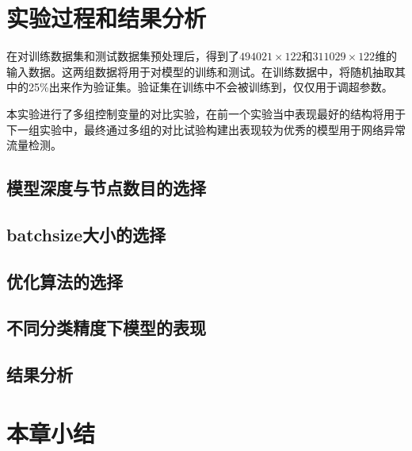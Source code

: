 \section{实验过程和结果分析}

在对训练数据集和测试数据集预处理后，得到了$494021 \times 122$和$311029 \times 122$维的输入数据。这两组数据将用于对模型的训练和测试。在训练数据中，将随机抽取其中的25\%出来作为验证集。验证集在训练中不会被训练到，仅仅用于调超参数。

本实验进行了多组控制变量的对比实验，在前一个实验当中表现最好的结构将用于下一组实验中，最终通过多组的对比试验构建出表现较为优秀的模型用于网络异常流量检测。

\subsection{模型深度与节点数目的选择}

\subsection{batchsize大小的选择}

\subsection{优化算法的选择}

\subsection{不同分类精度下模型的表现}

\subsection{结果分析}

\section{本章小结}